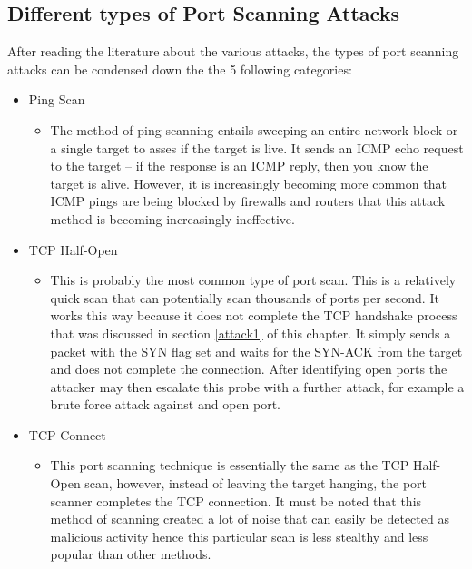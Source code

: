 \subsection{Different types of Port Scanning Attacks}

After reading the literature about the various attacks, the types of port scanning attacks can be condensed down the the 5 following categories:
\begin{itemize}
    \item Ping Scan
    \begin{itemize}
        \item The method of ping scanning entails sweeping an entire network block or a single target to asses if the target is live. It sends an ICMP echo request to the target – if the response is an ICMP reply, then you know the target is alive. However, it is increasingly becoming more common that ICMP pings are being blocked by firewalls and routers that this attack method is becoming increasingly ineffective.
    \end{itemize}
    \item TCP Half-Open
    \begin{itemize}
        \item This is probably the most common type of port scan. This is a relatively quick scan that can potentially scan thousands of ports per second. It works this way because it does not complete the TCP handshake process that was discussed in section \ref{attack1} of this chapter. It simply sends a packet with the SYN flag set and waits for the SYN-ACK from the target and does not complete the connection. After identifying open ports the attacker may then escalate this probe with a further attack, for example a brute force attack against and open port.
    \end{itemize} 
    \newpage
    \item TCP Connect
    \begin{itemize}
        \item This port scanning technique is essentially the same as the TCP Half-Open scan, however, instead of leaving the target hanging, the port scanner completes the TCP connection. It must be noted that this method of scanning created a lot of noise that can easily be detected as malicious activity hence this particular scan is less stealthy and less popular than other methods.


\end{itemize}
\end{itemize}
